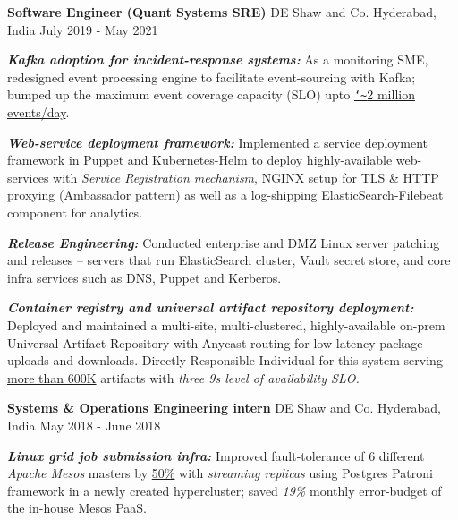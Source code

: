\vspace{-0.2cm}

\begin{cventries}
  \cventry
    {\textbf{Software Engineer (Quant Systems SRE)}} %
    {DE Shaw and Co.} %
    {Hyderabad, India} %
    {July 2019 - May 2021} %
    {
      \begin{cvitems} %
        \item {\textbf{\textit{Kafka adoption for incident-response systems:}} As a monitoring SME, redesigned event processing engine to facilitate event-sourcing with Kafka; bumped up the maximum event coverage capacity (SLO) upto  \underline{\texttt{\char`\~}2 million events/day}.
        }
        \vspace{0.1cm}
        \item {\textbf{\textit{Web-service deployment framework:}} Implemented a service deployment framework in Puppet and Kubernetes-Helm to deploy highly-available web-services with \textit{Service Registration mechanism}, NGINX setup for TLS \& HTTP proxying (Ambassador pattern) as well as a log-shipping ElasticSearch-Filebeat component for analytics.
        }
        \vspace{0.1cm}
        \item {\textbf{\textit{Release Engineering:}} Conducted enterprise and DMZ Linux server patching and releases -- servers that run ElasticSearch cluster,  Vault secret store, and core infra services such as DNS, Puppet and Kerberos.
        }
        \vspace{0.1cm}
        \item {\textbf{\textit{Container registry and universal artifact repository deployment:}} Deployed and maintained a multi-site, multi-clustered, highly-available on-prem Universal Artifact Repository with Anycast routing for low-latency package uploads and downloads. Directly Responsible Individual for this system serving \underline{more than 600K} artifacts with \textit{three 9s level of availability SLO.}
        }
      \end{cvitems}
    }
  \cventry
    {\textbf{Systems \& Operations Engineering intern}} %
    {DE Shaw and Co.} %
    {Hyderabad, India} %
    {May 2018 - June 2018} %
    {
      \begin{cvitems} %
        \item {\textbf{\textit{Linux grid job submission infra:}} Improved fault-tolerance of 6 different \textit{Apache Mesos} masters by \underline{50\%} with \textit{streaming replicas} using Postgres Patroni framework in a newly created hypercluster; saved \textit{19\%} monthly error-budget of the in-house Mesos PaaS.
}
\end{cvitems}}
\end{cventries}
